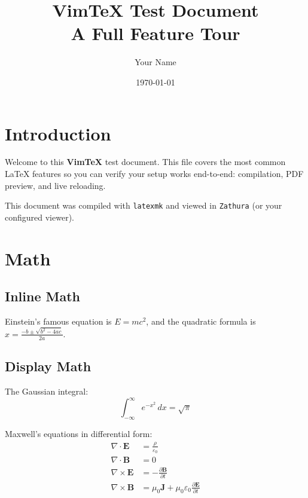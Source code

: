 \documentclass[12pt, a4paper]{article}
\title{\textbf{VimTeX Test Document} \\ \large A Full Feature Tour}
\author{Your Name}
\date{\today}
\begin{document}

\maketitle
\tableofcontents
\newpage

\section{Introduction}

Welcome to this \textbf{VimTeX} test document. This file covers the most
common \LaTeX{} features so you can verify your setup works end-to-end:
compilation, PDF preview, and live reloading.

This document was compiled with \texttt{latexmk} and viewed in
\texttt{Zathura} (or your configured viewer).

\section{Math}
\label{sec:math}

\subsection{Inline Math}

Einstein's famous equation is $E = mc^2$, and the quadratic formula is
$x = \frac{-b \pm \sqrt{b^2 - 4ac}}{2a}$.

\subsection{Display Math}

The Gaussian integral:
\[
  \int_{-\infty}^{\infty} e^{-x^2} \, dx = \sqrt{\pi}
\]

Maxwell's equations in differential form:
\begin{align}
  \nabla \cdot \mathbf{E}  &= \frac{\rho}{\varepsilon_0} \\
  \nabla \cdot \mathbf{B}  &= 0 \\
  \nabla \times \mathbf{E} &= -\frac{\partial \mathbf{B}}{\partial t} \\
  \nabla \times \mathbf{B} &= \mu_0 \mathbf{J}
                             + \mu_0 \varepsilon_0 \frac{\partial \mathbf{E}}{\partial t}
\end{align}
\end{document}
